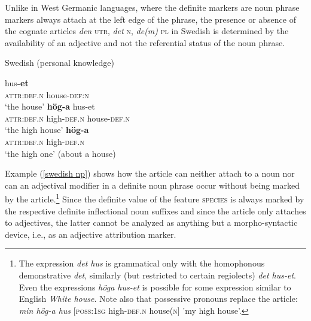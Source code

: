 Unlike in West Germanic languages, where the definite markers are noun phrase markers always attach at the left edge of the phrase, the presence or absence of the cognate articles \textit{den} \textsc{utr}, \textit{det} \textsc{n}, \textit{de(m)} \textsc{pl} in Swedish is determined by the availability of an adjective and not the referential status of the noun phrase. 
\begin{exe}
\ex \rm{Swedish (personal knowledge)}
\label{swedish np}
\begin{xlist}
\ex
{} hus\textbf{-et}\\
	\textsc{attr:def.n} house-\textsc{def:n}\\
\glt	‘the house’
\ex	
{} \textbf{hög-a} hus-et\\
	\textsc{attr:def.n} high-\textsc{def.n} house-\textsc{def.n}\\
\glt	‘the high house’
\ex 
\label{art0}
 \textbf{hög-a}\\
	\textsc{attr:def.n} high-\textsc{def.n}\\
\glt	‘the high one’ (about a house)
\end{xlist}
\end{exe}
Example (\ref{swedish np}) shows how the article can neither attach to a noun nor can an adjectival modifier in a definite noun phrase occur without being marked by the article.\footnote{The expression \textit{det hus} is grammatical only with the homophonous demonstrative \textit{det}, similarly (but restricted to certain regiolects) \textit{det hus-et}. Even the expressions \textit{höga hus-et} is possible for some expression similar to English \textit{White house}. Note also that possessive pronouns replace the article: \textit{min hög-a hus} [\textsc{poss:1sg} high-\textsc{def.n} house(\textsc{n}] 'my high house’.} Since the definite value of the feature \textsc{species} is always marked by the respective definite inflectional noun suffixes %
 and since the article only attaches to adjectives, the latter cannot be analyzed as anything but a morpho-syntactic device, i.e., as an adjective attribution marker.

